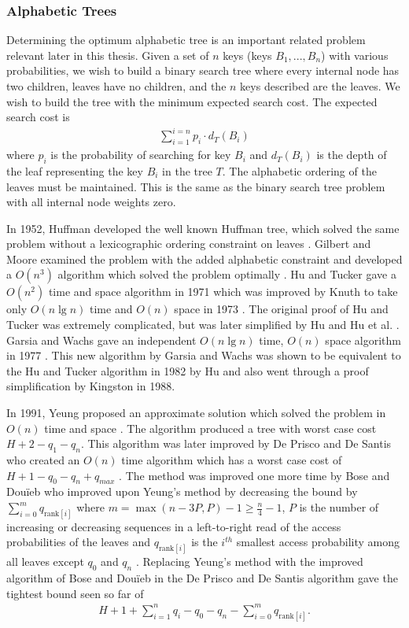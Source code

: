 \documentclass[]{beamer}
\theoremstyle{plain}
\begin{document}
 
\begin{frame} \frametitle{Alphabetic Trees}

Determining the optimum alphabetic tree is an important related problem relevant later in this thesis. Given a set of $n$ keys (keys $B_1, ..., B_n$) with various probabilities, we wish to build a binary search tree where every internal node has two children, leaves have no children, and the $n$ keys described are the leaves. We wish to build the tree with the minimum expected search cost. The expected search cost is
\begin{align*}
\sum_{i=1}^{i=n} p_i \cdot d_T(B_i)
\end{align*}
where $p_i$ is the probability of searching for key $B_i$ and $d_T(B_i)$ is the depth of the leaf representing the key $B_i$ in the tree $T$. The alphabetic ordering of the leaves must be maintained. This is the same as the binary search tree problem with all internal node weights zero.

In 1952, Huffman developed the well known Huffman tree, which solved the same problem without a lexicographic ordering constraint on leaves \cite{huffman1952method}. Gilbert and Moore examined the problem with the added alphabetic constraint and developed a $O(n^3)$ algorithm which solved the problem optimally \cite{gilbert1959variable}. Hu and Tucker gave a $O(n^2)$ time and space algorithm in 1971 \cite{hu1971optimal} which was improved by Knuth to take only $O(n \lg n)$ time and $O(n)$ space in 1973 \cite{knuth1973sorting}. The original proof of Hu and Tucker was extremely complicated, but was later simplified by Hu \cite{hu1973new} and Hu et al. \cite{hu1979binary}. Garsia and Wachs gave an independent $O(n \lg n)$ time, $O(n)$ space algorithm in 1977 \cite{garsia1977new}. This new algorithm by Garsia and Wachs was shown to be equivalent to the Hu and Tucker algorithm in 1982 by Hu \cite{Hu1982Book} and also went through a proof simplification \cite{kingston1988new} by Kingston in 1988.

In 1991, Yeung proposed an approximate solution which solved the problem in $O(n)$ time and space \cite{yeung1991alphabetic}. The algorithm produced a tree with worst case cost $H + 2 - q_1-q_n$. This algorithm was later improved by De Prisco and De Santis who created an $O(n)$ time algorithm which has a worst case cost of $H+1-q_0-q_n+q_{max}$ \cite{de1993binary}. The method was improved one more time by Bose and Dou\"{i}eb who improved upon Yeung's method by decreasing the bound by $\sum_{i=0}^m q_{\text{rank}[i]}$ where $m=\max({n-3P,P})-1 \geq \frac{n}{4} - 1$, $P$ is the number of increasing or decreasing sequences in a left-to-right read of the access probabilities of the leaves and $q_{\text{rank}[i]}$ is the $i^{th}$ smallest access probability among all leaves except $q_0$ and $q_n$ \cite{bose2009efficient}. Replacing Yeung's method with the improved algorithm of Bose and Dou\"{i}eb in the De Prisco and De Santis algorithm gave the tightest bound seen so far of 
\begin{align*}
H+1+\sum_{i=1}^{n}q_i-q_0-q_n-\sum_{i=0}^m q_{\text{rank}[i]}. 
\end{align*}
\end{frame}
\end{document}
